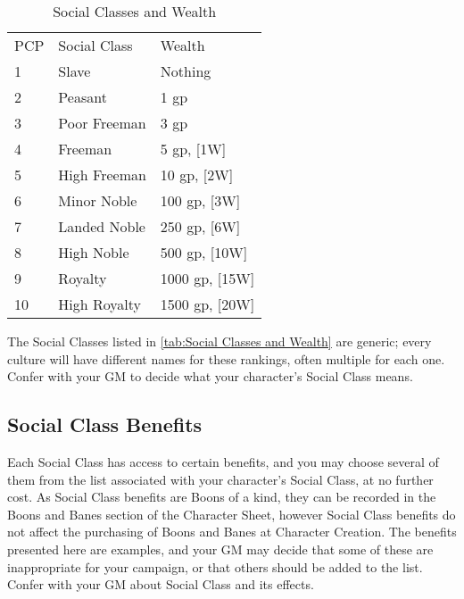 \documentclass[oneside,11pt,english]{book}
\begin{document}
	\setlength{\intextsep}{0pt}
	\begin{wraptable}{r}{7.5cm}
		\centering
		\begin{tabu} spread 0pt {X[-1,c]XX}
			PCP		&Social Class	&Wealth\\
			1		&Slave			&Nothing\\
			2		&Peasant		&1 gp\\
			3		&Poor Freeman	&3 gp\\
			4		&Freeman		&5 gp, [1W]\\
			5		&High Freeman	&10 gp, [2W]\\
			6		&Minor Noble	&100 gp, [3W]\\
			7		&Landed Noble	&250 gp, [6W]\\
			8		&High Noble		&500 gp, [10W]\\
			9		&Royalty		&1000 gp, [15W]\\
			10		&High Royalty	&1500 gp, [20W]\\
		\end{tabu}
		\caption{Social Classes and Wealth}\vspace{-10pt}
		\label{tab:Social Classes and Wealth}
	\end{wraptable}
	\setlength{\intextsep}{\oldintextsep}

The Social Classes listed in \autoref{tab:Social Classes and Wealth} are generic; every culture will have different names for these 
rankings, often multiple for each one. Confer with your GM to decide what your character’s Social Class means.

\subsection{Social Class Benefits} Each Social Class has access to certain benefits, and you may choose several of them from the list associated with your character’s Social Class, at no further cost. As Social Class benefits are Boons of a kind, they can be recorded in the Boons and Banes section of the Character Sheet, however Social Class benefits do not affect the purchasing of Boons and Banes at Character Creation.
The benefits presented here are examples, and your GM may decide that some of these are inappropriate for your campaign, or that others should be added to the list. Confer with your GM about Social Class and its effects.
\end{document}

